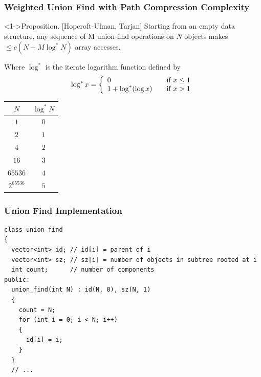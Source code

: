 \documentclass{beamer}
\begin{document}

\begin{frame}%
\frametitle{Weighted Union Find with Path Compression Complexity}

\scriptsize

\begin{block}<1->{Proposition. [Hopcroft-Ulman, Tarjan]}
Starting from an empty data structure, any sequence of M union-find operations
on $N$ objects makes $\le c ( N + M \log^* N )$ array accesses.
\end{block}
Where $\log^*$ is the iterate logarithm function defined by
\[ \log^* x = \left\{
  \begin{array}{l l}
    0 & \quad \text{if $x \le 1$}\\
    1 + \log^*(\log x) & \quad \text{if $x > 1$}
  \end{array} \right.\]
\begin{center}
\begin{tabular}{|c|c|}
\hline
$N$ & $\log^* N$\\
\hline
$1$ & $0$\\
$2$ & $1$\\
$4$ & $2$\\
$16$ & $3$\\
$65536$ & $4$\\
$2^{65536}$ & $5$\\
\hline
\end{tabular}
\end{center}

\end{frame}

\begin{frame}[containsverbatim]
\frametitle{Union Find Implementation}

\scriptsize

\begin{lstlisting}[mathescape]
class union_find
{
  vector<int> id; // id[i] = parent of i
  vector<int> sz; // sz[i] = number of objects in subtree rooted at i
  int count;      // number of components
public:
  union_find(int N) : id(N, 0), sz(N, 1)
  {
    count = N;
    for (int i = 0; i < N; i++)
    {
      id[i] = i;
    }
  }
  // ...
\end{lstlisting}

\end{frame}
\end{document}

